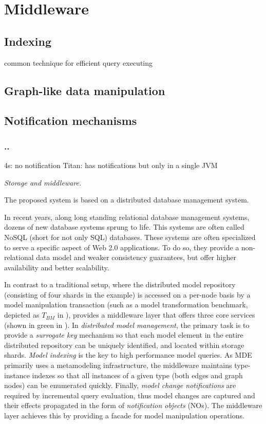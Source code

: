 \section{Middleware}
\label{sec:middleware}

\subsection{Indexing}

common technique for efficient query executing

\subsection{Graph-like data manipulation}



\subsection{Notification mechanisms}


\subsubsection{..}

4s: no notification
Titan: has notifications but only in a single JVM

\emph{Storage and middleware.}\label{storage_and_middleware}

The proposed system is based on a distributed database management system.

In recent years, along long standing relational database management systems, dozens of new database systems sprung to life. This systems are often called NoSQL (short for not only SQL) databases.
These systems are often specialized to serve a specific aspect of Web 2.0 applications. To do so, they provide a non-relational data model and weaker consistency guarantees, but offer higher availability and better scalability.

In contrast to a traditional setup, where the distributed model repository (consisting of four shards in the example) is accessed on a per-node basis by a model manipulation transaction (such as a model transformation benchmark, depicted as $T_{BM}$ in ), \iqd{} provides a middleware layer that offers three core services (shown in green in ).
In {{\em distributed model management}}, the primary task is to provide a \emph{surrogate key} mechanism so that each model element in the entire distributed repository can be uniquely identified, and located within storage shards.
{{\em Model indexing}} is the key to high performance model queries. As MDE primarily uses a metamodeling infrastructure, the \iqd{} middleware maintains type-instance indexes so that all instances of a given type (both edges and graph nodes) can be enumerated quickly.
Finally, {{\em model change notifications}} are required by incremental query evaluation, thus model changes are captured and their effects propagated in the form of \emph{notification objects} (NOs). The middleware layer achieves this by providing a facade for model manipulation operations. 

